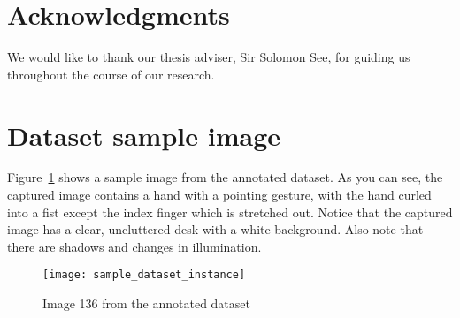 \documentclass{acm_proc_article-sp}
\begin{document}
\section{Acknowledgments}

We would like to thank our thesis adviser, Sir Solomon See, for guiding us throughout the course of our research.


%

%
%
\appendix
\section{Dataset sample image}
\label{sample_dataset}
Figure~\ref{fig_sim} shows a sample image from the annotated dataset. As you can see, the captured image contains a hand with a pointing gesture, with the hand curled into a fist except the index finger which is stretched out. Notice that the captured image has a clear, uncluttered desk with a white background. Also note that there are shadows and changes in illumination.

\begin{figure}[!ht]
\centering
\texttt{[image: sample\_dataset\_instance]}
\caption{Image 136 from the annotated dataset}
\label{fig_sim}
\end{figure}


\end{document}
